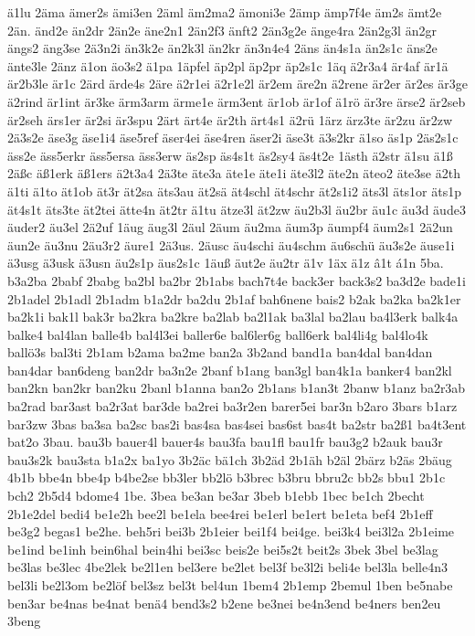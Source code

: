 {ä1lu
2äma
ämer2s
ämi3en
2äml
äm2ma2
ämoni3e
2ämp
ämp7f4e
äm2s
ämt2e
2än.
änd2e
än2dr
2än2e
äne2n1
2än2f3
änft2
2än3g2e
änge4ra
2än2g3l
än2gr
ängs2
äng3se
2ä3n2i
än3k2e
än2k3l
än2kr
än3n4e4
2äns
än4s1a
än2s1c
äns2e
änte3le
2änz
ä1on
äo3s2
ä1pa
1äpfel
äp2pl
äp2pr
äp2s1c
1äq
ä2r3a4
är4af
är1ä
är2b3le
är1c
2ärd
ärde4s
2äre
ä2r1ei
ä2r1e2l
är2em
äre2n
ä2rene
är2er
är2es
är3ge
ä2rind
är1int
är3ke
ärm3arm
ärme1e
ärm3ent
är1ob
är1of
ä1rö
är3re
ärse2
är2seb
är2seh
ärs1er
är2si
är3spu
2ärt
ärt4e
är2th
ärt4s1
ä2rü
1ärz
ärz3te
är2zu
är2zw
2ä3s2e
äse3g
äse1i4
äse5ref
äser4ei
äse4ren
äser2i
äse3t
ä3s2kr
ä1so
äs1p
2äs2s1c
äss2e
äss5erkr
äss5ersa
äss3erw
äs2sp
äs4s1t
äs2sy4
äs4t2e
1ästh
ä2str
ä1su
ä1ß
2äßc
äß1erk
äß1ers
ä2t3a4
2ä3te
äte3a
äte1e
äte1i
äte3l2
äte2n
äteo2
äte3se
ä2th
ä1ti
ä1to
ät1ob
ät3r
ät2sa
äts3au
ät2sä
ät4schl
ät4schr
ät2s1i2
äts3l
äts1or
äts1p
ät4s1t
äts3te
ät2tei
ätte4n
ät2tr
ä1tu
ätze3l
ät2zw
äu2b3l
äu2br
äu1c
äu3d
äude3
äuder2
äu3el
2ä2uf
1äug
äug3l
2äul
2äum
äu2ma
äum3p
äumpf4
äum2s1
2ä2un
äun2e
äu3nu
2äu3r2
äure1
2ä3us.
2äusc
äu4schi
äu4schm
äu6schü
äu3s2e
äuse1i
ä3usg
ä3usk
ä3usn
äu2s1p
äus2s1c
1äuß
äut2e
äu2tr
ä1v
1äx
ä1z
â1t
á1n
5ba.
b3a2ba
2babf
2babg
ba2bl
ba2br
2b1abs
bach7t4e
back3er
back3s2
ba3d2e
bade1i
2b1adel
2b1adl
2b1adm
b1a2dr
ba2du
2b1af
bah6nene
bais2
b2ak
ba2ka
ba2k1er
ba2k1i
bak1l
bak3r
ba2kra
ba2kre
ba2lab
ba2l1ak
ba3lal
ba2lau
ba4l3erk
balk4a
balke4
bal4lan
balle4b
bal4l3ei
baller6e
bal6ler6g
ball6erk
bal4li4g
bal4lo4k
ballö3s
bal3ti
2b1am
b2ama
ba2me
ban2a
3b2and
band1a
ban4dal
ban4dan
ban4dar
ban6deng
ban2dr
ba3n2e
2banf
b1ang
ban3gl
ban4k1a
banker4
ban2kl
ban2kn
ban2kr
ban2ku
2banl
b1anna
ban2o
2b1ans
b1an3t
2banw
b1anz
ba2r3ab
ba2rad
bar3ast
ba2r3at
bar3de
ba2rei
ba3r2en
barer5ei
bar3n
b2aro
3bars
b1arz
bar3zw
3bas
ba3sa
ba2sc
bas2i
bas4sa
bas4sei
bas6st
bas4t
ba2str
ba2ß1
ba4t3ent
bat2o
3bau.
bau3b
bauer4l
bauer4s
bau3fa
bau1fl
bau1fr
bau3g2
b2auk
bau3r
bau3s2k
bau3sta
b1a2x
ba1yo
3b2äc
bä1ch
3b2äd
2b1äh
b2äl
2bärz
b2äs
2bäug
4b1b
bbe4n
bbe4p
b4be2se
bb3ler
bb2lö
b3brec
b3bru
bbru2c
bb2s
bbu1
2b1c
bch2
2b5d4
bdome4
1be.
3bea
be3an
be3ar
3beb
b1ebb
1bec
be1ch
2becht
2b1e2del
bedi4
be1e2h
bee2l
be1ela
bee4rei
be1erl
be1ert
be1eta
bef4
2b1eff
be3g2
begas1
be2he.
beh5ri
bei3b
2b1eier
bei1f4
bei4ge.
bei3k4
bei3l2a
2b1eime
be1ind
be1inh
bein6hal
bein4hi
bei3sc
beis2e
bei5s2t
beit2s
3bek
3bel
be3lag
be3las
be3lec
4be2lek
be2l1en
bel3ere
be2let
bel3f
be3l2i
beli4e
bel3la
belle4n3
bel3li
be2l3om
be2löf
bel3sz
bel3t
bel4un
1bem4
2b1emp
2bemul
1ben
be5nabe
ben3ar
be4nas
be4nat
benä4
bend3s2
b2ene
be3nei
be4n3end
be4ners
ben2eu
3beng
}
